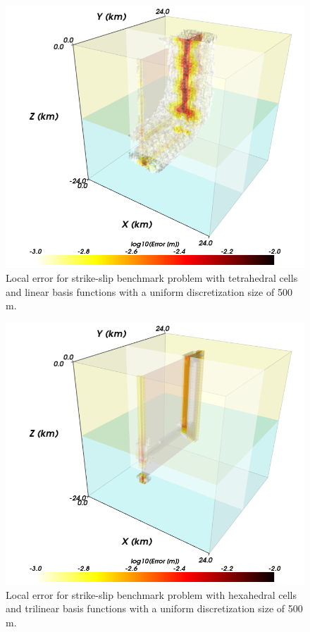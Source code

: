 \begin{figure}[htbp]
  \includegraphics[scale=0.33]{benchmarks/figs/strikeslip_error_tet4_0500m}
  \caption{Local error for strike-slip benchmark problem with
    tetrahedral cells and linear basis functions with a uniform
    discretization size of 500 m.}
\label{fig:benchmark:strikeslip:tet4:500m}
\end{figure}

\begin{figure}[htbp]
  \includegraphics[scale=0.33]{benchmarks/figs/strikeslip_error_hex8_0500m}
  \caption{Local error for strike-slip benchmark problem with
    hexahedral cells and trilinear basis functions with a uniform
    discretization size of 500 m.}
  \label{fig:benchmark:strikeslip:hex8:500m}
\end{figure}

